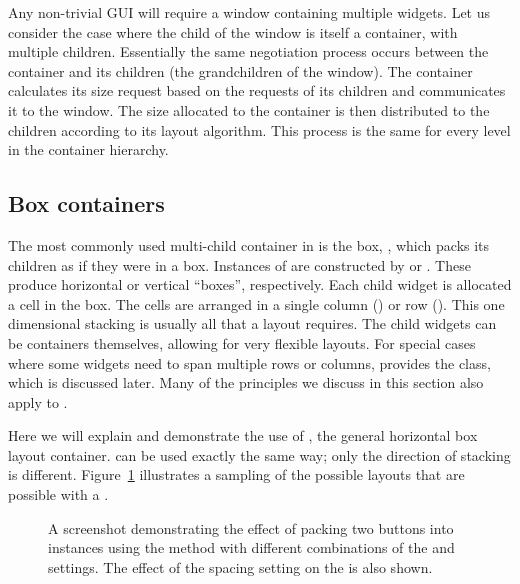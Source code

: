 Any non-trivial GUI will require a window containing multiple
widgets. Let us consider the case where the child of the window is
itself a container, with multiple children.  Essentially the same
negotiation process occurs between the container and its children (the
grandchildren of the window). The container calculates its size
request based on the requests of its children and communicates it to
the window. The size allocated to the container is then distributed to
the children according to its layout algorithm. This process is the
same for every level in the container hierarchy.

\subsection{Box containers}
\label{sec:RGtk2:layout:box}

The most commonly used multi-child container in \GTK\/ is the box,
, which packs its children as if they were in a
box. Instances of  are constructed by 
or .  These produce horizontal or vertical
``boxes'', respectively. Each child widget is allocated a cell in the
box.  The cells are arranged in a single column () or
row (). This one dimensional stacking is usually all
that a layout requires. The child widgets can be containers
themselves, allowing for very flexible layouts. For special cases
where some widgets need to span multiple rows or columns, \GTK\/
provides the  class, which is discussed later.  Many
of the principles we discuss in this section also apply to
.

Here we will explain and demonstrate the use of , the
general horizontal box layout container.  can be used
exactly the same way; only the direction of stacking is different.
Figure~\ref{fig:packing} illustrates a sampling of the possible
layouts that are possible with a .

\begin{figure}[h!tbp]
  \begin{center}
    \caption{\label{fig:packing}A screenshot demonstrating the effect
      of packing two buttons into  instances using the
       method with different combinations of
      the  and
       settings.  The effect of the
       spacing setting on the
       is also shown.}
  \end{center}
\end{figure}

